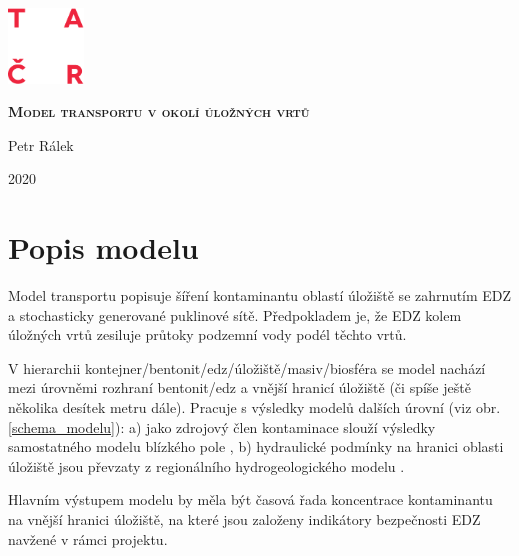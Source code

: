\documentclass[11pt,a4paper]{article}
\newcommand{\obraz}[1]{(viz obr. \ref{#1})}
\newcommand{\jb}[1]{{\color{violet} JB: #1}}
\begin{document}
\begin{onehalfspacing} 


\begin{titlepage}
    \includegraphics[width=2cm]{logo_TACR_zakl.pdf}

    \vspace{6cm}
    {\centering	
      {\scshape\bf\huge Model transportu v okolí úložných vrtů\par}
      \vspace{3cm}
      
      {\LARGE Petr Rálek}
      
      \vspace{1cm}
      {\LARGE 2020}
      
    }
    \vfill
\end{titlepage}



\section{Popis modelu}

Model transportu popisuje šíření kontaminantu oblastí úložiště se zahrnutím EDZ a stochasticky generované puklinové sítě. Předpokladem je, že EDZ kolem úložných vrtů zesiluje průtoky podzemní vody podél těchto vrtů.

V hierarchii kontejner/bentonit/edz/úložiště/masiv/biosféra se model nachází mezi úrovněmi rozhraní bentonit/edz a vnější hranicí úložiště (či spíše ještě několika desítek metru dále). Pracuje s výsledky modelů dalších úrovní \obraz{schema_modelu}: a) jako zdrojový člen kontaminace slouží výsledky samostatného modelu blízkého pole \cite{blizkepole}, b) hydraulické podmínky na hranici oblasti úložiště jsou převzaty z regionálního hydrogeologického modelu \cite{riha_hradek}. 

Hlavním výstupem modelu by měla být časová řada koncentrace kontaminantu na vnější hranici úložiště,
na které jsou založeny indikátory bezpečnosti EDZ navžené v rámci projektu.



\end{onehalfspacing}
\end{document}
